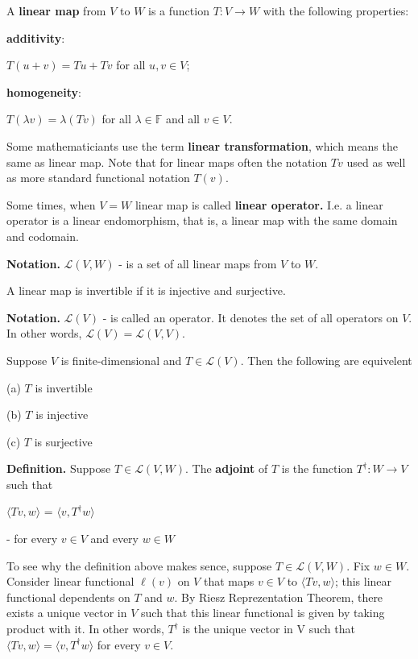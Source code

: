 \documentclass{article}
\begin{document}
A \textbf{linear map} from $V$ to $W$ is a function $T: V \rightarrow W $ with the following properties:

\textbf{additivity}:

$T(u + v) = Tu + Tv$ for all $u,v \in V$;

\textbf{homogeneity}:

$T(\lambda v) = \lambda (T v) $ for all $\lambda \in \mathbb{F}$ and all $v \in V$.

\skl

Some mathematiciants use the term \textbf{linear transformation},  which means the same as linear map.
Note that for linear maps often the notation $Tv$ used as well as more standard functional notation $T(v)$. 

Some times, when $V = W$ linear map is called \textbf{linear operator.} I.e. a linear operator is a linear endomorphism, that is, a linear map with the same domain and codomain.


\skl


\textbf{Notation.}  $\mathcal{L}(V, W)$ - is a set of all linear maps from $V$ to $W$.

A linear map is invertible if it is injective and surjective.


\textbf{Notation.}  $\mathcal{L}(V)$ - is called an operator. It denotes the set of all operators on $V$. In other words, $\mathcal{L}(V) = \mathcal{L}(V,V)$.

Suppose $V$ is finite-dimensional and $T \in \mathcal{L}(V)$. Then the following are equivelent

(a) $T$ is invertible

(b) $T$ is injective

(c) $T$ is surjective


\skl

\textbf{Definition.} Suppose $T \in \mathcal{L}(V,W)$. The \textbf{adjoint} of $T$ is the function $T^\dag : W \rightarrow V$ such that

$\langle Tv, w \rangle$ = $\langle v, T^\dag w \rangle$

- for every $v \in V$ and every $w \in W$

\skl

To see why the definition above makes sence, suppose $T \in \mathcal{L}(V,W)$. Fix $w \in W$. Consider linear functional $\ell (v)$ on $V$ that maps $v \in V$ to $\langle Tv, w \rangle$; this linear functional dependents on $T$ and $w$. By Riesz Reprezentation Theorem, there exists a unique vector in $V$ such that this linear functional is given by taking product with it. In other words, $T^\dag$ is the unique vector in V such that $\langle Tv, w \rangle = \langle v, T^\dag w \rangle$ for every 
$v \in V$.
\end{document}
